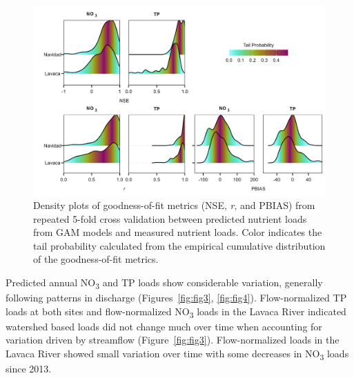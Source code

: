 \documentclass[sn-basic,referee,lineno,pdflatex]{sn-jnl}
\begin{document}
\begin{figure}

{\centering \includegraphics[width=1\linewidth,]{Schramm-2023-05-AS_files/figure-latex/fig2-1} 

}

\caption{Density plots of goodness-of-fit metrics (NSE, \textit{r}, and PBIAS) from repeated 5-fold cross validation between predicted nutrient loads from GAM models and measured nutrient loads. Color indicates the tail probability calculated from the empirical cumulative distribution of the goodness-of-fit metrics.}\label{fig:fig2}
\end{figure}

Predicted annual NO\textsubscript{3} and TP loads show considerable
variation, generally following patterns in discharge
(Figures~\ref{fig:fig3}, \ref{fig:fig4}). Flow-normalized TP loads at
both sites and flow-normalized NO\textsubscript{3} loads in the Lavaca
River indicated watershed based loads did not change much over time when
accounting for variation driven by streamflow (Figure~\ref{fig:fig3}).
Flow-normalized loads in the Lavaca River showed small variation over
time with some decreases in NO\textsubscript{3} loads since 2013.
\end{document}

